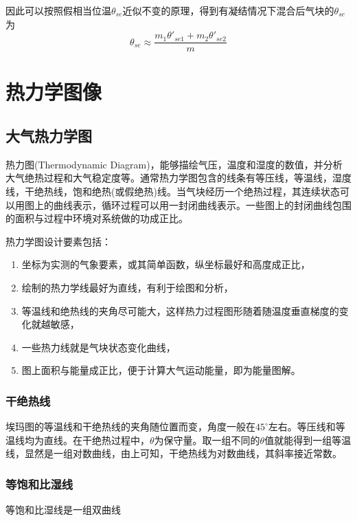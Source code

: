 \documentclass[UTF8,a4paper,11pt,oneside]{ctexbook}
\begin{document}
因此可以按照假相当位温\(\theta_{se}\)近似不变的原理，得到有凝结情况下混合后气块的\(\theta_{se}\)为
\begin{equation}
\theta_{se}\approx\dfrac{m_1\theta'_{se1}+m_2\theta'_{se2}}{m}
\end{equation}

\chapter{热力学图像}

\section{大气热力学图}

热力图(Thermodynamic Diagram)，能够描绘气压，温度和湿度的数值，并分析大气绝热过程和大气稳定度等。通常热力学图包含的线条有等压线，等温线，湿度线，干绝热线，饱和绝热(或假绝热)线。当气块经历一个绝热过程，其连续状态可以用图上的曲线表示，循环过程可以用一封闭曲线表示。一些图上的封闭曲线包围的面积与过程中环境对系统做的功成正比。

热力学图设计要素包括：
\begin{enumerate}
    \item 坐标为实测的气象要素，或其简单函数，纵坐标最好和高度成正比，
    \item 绘制的热力学线最好为直线，有利于绘图和分析，
    \item 等温线和绝热线的夹角尽可能大，这样热力过程图形随着随温度垂直梯度的变化就越敏感，
    \item 一些热力线就是气块状态变化曲线，
    \item 图上面积与能量成正比，便于计算大气运动能量，即为能量图解。
\end{enumerate}

\subsection{干绝热线}

埃玛图的等温线和干绝热线的夹角随位置而变，角度一般在\(45^\circ\)左右。等压线和等温线均为直线。在干绝热过程中，\(\theta\)为保守量。取一组不同的\(\theta\)值就能得到一组等温线，显然是一组对数曲线，由上可知，干绝热线为对数曲线，其斜率接近常数。

\subsection{等饱和比湿线}

等饱和比湿线是一组双曲线
\end{document}

